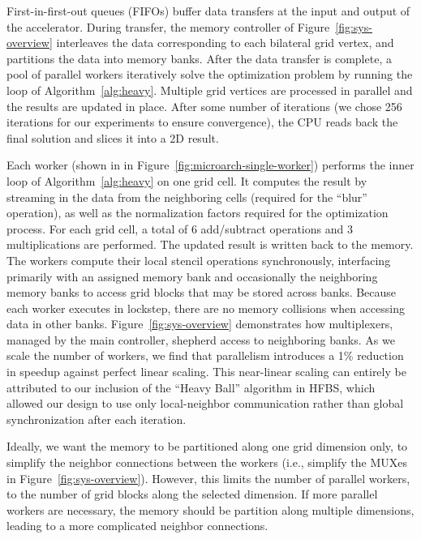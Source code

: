 First-in-first-out queues (FIFOs) buffer data transfers at the input and output of the accelerator.
During transfer, the memory controller of Figure~\ref{fig:sys-overview} interleaves the data corresponding to each bilateral grid vertex, and partitions the data into memory banks.
After the data transfer is complete, a pool of parallel workers iteratively solve the optimization problem by running the loop of Algorithm~\ref{alg:heavy}.
Multiple grid vertices are processed in parallel and the results are updated in place.
After some number of iterations (we chose 256 iterations for our experiments to ensure convergence), the CPU reads back the final solution and slices it into a 2D result.


Each worker (shown in in Figure~\ref{fig:microarch-single-worker}) performs the inner loop of Algorithm~\ref{alg:heavy} on one grid cell.
It computes the result by streaming in the data from the neighboring cells (required for the ``blur'' operation), as well as the normalization factors required for the optimization process.
For each grid cell, a total of 6 add/subtract operations and 3 multiplications are performed. The updated result is written back to the memory.
The workers compute their local stencil operations synchronously, interfacing primarily with an assigned memory bank and occasionally the neighboring memory banks to access grid blocks that may be stored across banks.
Because each worker executes in lockstep, there are no memory collisions when accessing data in other banks.
Figure~\ref{fig:sys-overview} demonstrates how multiplexers, managed by the main controller, shepherd access to neighboring banks.
As we scale the number of workers, we find that parallelism introduces a 1\% reduction in speedup against perfect linear scaling.
This near-linear scaling can entirely be attributed to our inclusion of the ``Heavy Ball'' algorithm in HFBS, which allowed our design to use only local-neighbor communication rather than global synchronization after each iteration.


Ideally, we want the memory to be partitioned along one grid dimension only, to simplify the neighbor connections between the workers (i.e., simplify the MUXes in Figure~\ref{fig:sys-overview}).
However, this limits the number of parallel workers, to the number of grid blocks along the selected dimension.
If more parallel workers are necessary, the memory should be partition along multiple dimensions, leading to a more complicated neighbor connections.



